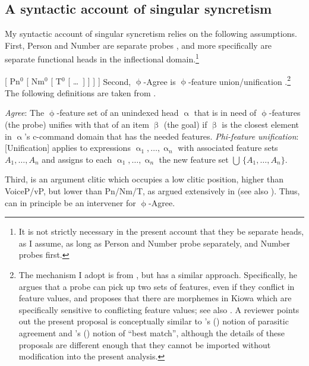 \documentclass[output=paper]{langscibook}
\begin{document}
\subsection{A syntactic account of singular \sti syncretism}	


My syntactic account of singular \sti syncretism relies on the following assumptions. First, Person and Number are separate probes \citep{SigurTHsson:2008dm,Bejar:2008sw}, and more specifically are separate functional heads in the inflectional domain.\footnote{It is not strictly necessary in the present account that they be separate heads, as I assume, as long as Person and Number probe separately, and Number probes first.}

\ea
    { [ Pn$^0$ [ Nm$^0$ [ T$^0$ [ \dots\ ] ] ] ] }
\z
Second, $\upphi$-Agree is $\upphi$-feature union/unification \citep{Kratzer:2009jq,Harbour:2009mh}.\footnote{The mechanism I adopt is from \citet{Kratzer:2009jq}, but \citet{Harbour:2009mh} has a similar approach. Specifically, he argues that a probe can pick up two sets of features, even if they conflict in feature values, and proposes that there are morphemes in Kiowa which are specifically sensitive to conflicting feature values; see also \citet{oxford2019inverse}. A reviewer points out the present proposal is conceptually similar to \citeauthor{kotek2014wh}'s (\citeyear{kotek2014wh})  notion of parasitic agreement and \citeauthor{vanUrk2015}'s (\citeyear{vanUrk2015}) notion of ``best match'', although the details of these proposals are different enough that they cannot be imported without modification into the present analysis.} The following definitions are taken from \citet{Kratzer:2009jq}.

\ea 
    \ea \textit{Agree}: The $\upphi$-feature set of an unindexed head $\upalpha$ that is in need of $\upphi $-features (the probe) unifies with that of an item $\upbeta$ (the goal) if $\upbeta$ is the closest element in $\upalpha$'s c-command domain that has the needed features. \citep[197]{Kratzer:2009jq}
    \ex \textit{Phi-feature unification}: [Unification] applies to expressions 
    $\upalpha_1, \dots, \upalpha_n$ with associated feature sets $A_1, \dots, A_n$ and 
    assigns to each $\upalpha_1, \dots, \upalpha_n$  the new feature set 
    $\bigcup\,\{A_1, \dots, A_n\}$. \citep[195]{Kratzer:2009jq} %
    \z
\z

Third, \sti is an argument clitic which occupies a low clitic position, higher than VoiceP/vP, but lower than Pn/Nm/T, as argued extensively in \citet[ch. 2]{Wood2015book} (see also  \citealt{eythors:1995ab,Kissock:1997gm,SigMin,Svenonius:2005vx,Svenonius:2006zt}).  Thus, \sti can in principle be an intervener for $\upphi$-Agree. %
\end{document}
